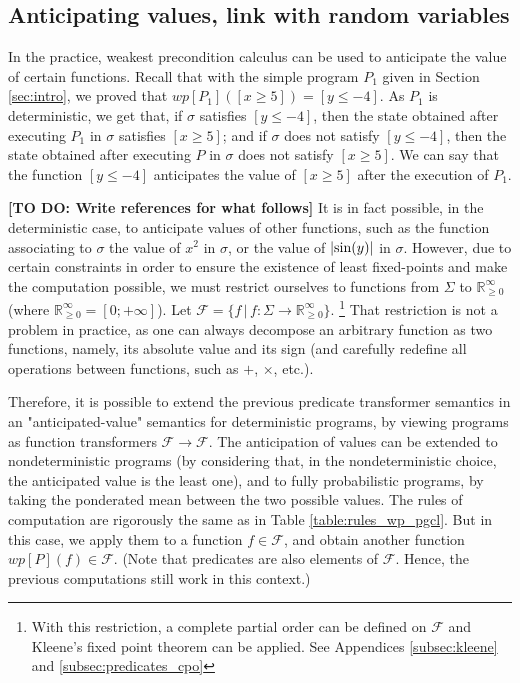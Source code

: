 \documentclass[a4paper,10pt]{llncs}
\def\RRposi {{\mathbb R_{\geq 0}^{\infty}}}
\newcommand\todo[1]{{\color{red}\textbf{[TO DO:  #1]}}}
\begin{document}
	\subsection{Anticipating values, link with random variables}
    \label{subsec:anticipation}
    
	In the practice, weakest precondition calculus can be used to anticipate the value of certain functions. Recall that with the simple program $P_1$ given in Section \ref{sec:intro}, we proved that $wp[P_1]([x \geq 5]) = [y \leq -4]$. As $P_1$ is deterministic, we get that, if $\sigma$ satisfies $[y \leq -4]$, then the state obtained after executing $P_1$ in $\sigma$ satisfies $[x \geq 5]$; and if $\sigma$ does not satisfy $[y \leq -4]$, then the state obtained after executing $P$ in $\sigma$ does not satisfy $[x \geq 5]$. We can say that the function $[y \leq -4]$ anticipates the value of $[x \geq 5]$ after the execution of $P_1$.\bigskip
	
	\todo{Write references for what follows}
It is in fact possible, in the deterministic case, to anticipate values of other functions, such as the function associating to $\sigma$ the value of $x^2$ in $\sigma$, or the value of $|\textnormal{sin}(y)|$ in $\sigma$. However, due to certain constraints in order to ensure the existence of least fixed-points and make the computation possible, we must restrict ourselves to functions from $\Sigma$ to $\RRposi$ (where $\RRposi = [0;+\infty]$). Let $\mathcal{F} = \{f \,|\, f : \Sigma \rightarrow \RRposi \}$. \footnote{With this restriction, a complete partial order can be defined on $\mathcal{F}$ and Kleene's fixed point theorem can be applied. See Appendices \ref{subsec:kleene} and \ref{subsec:predicates_cpo}} That restriction is not a problem in practice, as one can always decompose an arbitrary function as two functions, namely, its absolute value and its sign (and carefully redefine all operations between functions, such as $+$, $\times$, etc.). \bigskip

Therefore, it is possible to extend the previous predicate transformer semantics in an "anticipated-value" semantics for deterministic programs, by viewing programs as function transformers $\mathcal{F} \rightarrow \mathcal{F}$.
The anticipation of values can be extended to nondeterministic programs (by considering that, in the nondeterministic choice, the anticipated value is the least one), and to fully probabilistic programs, by taking the ponderated mean between the two possible values. The rules of computation are rigorously the same as in Table \ref{table:rules_wp_pgcl}. But in this case, we apply them to a function $f \in \mathcal{F}$, and obtain another function $wp[P](f) \in \mathcal{F}$. (Note that predicates are also elements of $\mathcal{F}$. Hence, the previous computations still work in this context.)
\end{document}
